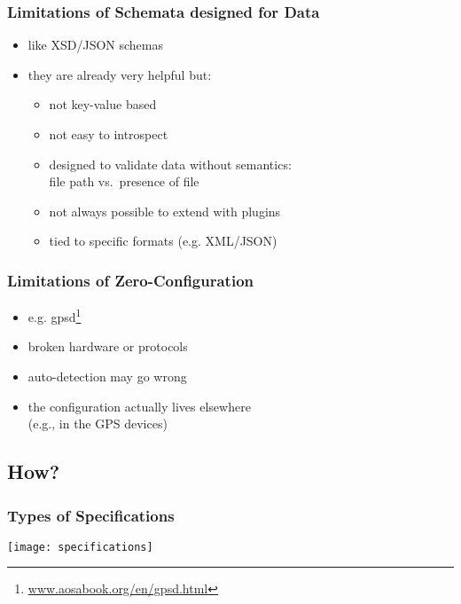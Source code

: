 \begin{frame}
	\methodQuestion{}
\end{frame}

\begin{frame}
	\frametitle{Limitations of Schemata designed for Data}
	\begin{itemize}
	\item like XSD/JSON schemas
	\item they are already very helpful but:
	\pause
	\begin{itemize}
	\item not key-value based
	\item not easy to introspect
	\item designed to validate data without semantics: \\ file path vs.\ presence of file
	\item not always possible to extend with plugins
	\item tied to specific formats (e.g. XML/JSON)
	\end{itemize}
	\end{itemize}
\end{frame}

\begin{frame}
	\frametitle{Limitations of Zero-Configuration}
	\begin{itemize}
	\item e.g. gpsd\footnote{\url{www.aosabook.org/en/gpsd.html}}
	\pause
	\item broken hardware or protocols
	\item auto-detection may go wrong
	\item the configuration actually lives elsewhere \\ (e.g., in the GPS devices)
	\end{itemize}
\end{frame}

\subsection{How?}

\begin{frame}
	\frametitle{Types of Specifications}
	\texttt{[image: specifications]}
\end{frame}


